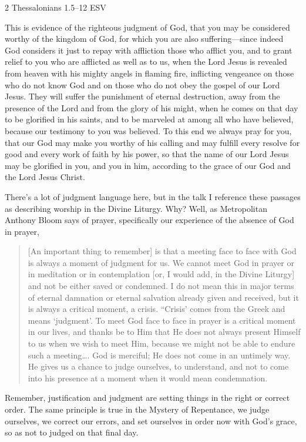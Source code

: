 \documentclass[
]{article}
\begin{document}
2 Thessalonians 1.5--12 ESV

This is evidence of the righteous judgment of God, that you may be
considered worthy of the kingdom of God, for which you are also
suffering---since indeed God considers it just to repay with affliction
those who afflict you, and to grant relief to you who are afflicted as
well as to us, when the Lord Jesus is revealed from heaven with his
mighty angels in flaming fire, inflicting vengeance on those who do not
know God and on those who do not obey the gospel of our Lord Jesus. They
will suffer the punishment of eternal destruction, away from the
presence of the Lord and from the glory of his might, when he comes on
that day to be glorified in his saints, and to be marveled at among all
who have believed, because our testimony to you was believed. To this
end we always pray for you, that our God may make you worthy of his
calling and may fulfill every resolve for good and every work of faith
by his power, so that the name of our Lord Jesus may be glorified in
you, and you in him, according to the grace of our God and the Lord
Jesus Christ.

There's a lot of judgment language here, but in the talk I reference
these passages as describing worship in the Divine Liturgy. Why? Well,
as Metropolitan Anthony Bloom says of prayer, specifically our
experience of the absence of God in prayer,

\begin{quote}
{[}An important thing to remember{]} is that a meeting face to face with
God is always a moment of judgment for us. We cannot meet God in prayer
or in meditation or in contemplation {[}or, I would add, in the Divine
Liturgy{]} and not be either saved or condemned. I do not mean this in
major terms of eternal damnation or eternal salvation already given and
received, but it is always a critical moment, a crisis. ``Crisis' comes
from the Greek and means `judgment'. To meet God face to face in prayer
is a critical moment in our lives, and thanks be to Him that He does not
always present Himself to us when we wish to meet Him, because we might
not be able to endure such a meeting\ldots. God is merciful; He does not
come in an untimely way. He gives us a chance to judge ourselves, to
understand, and not to come into his presence at a moment when it would
mean condemnation.
\end{quote}

Remember, justification and judgment are setting things in the right or
correct order. The same principle is true in the Mystery of Repentance,
we judge ourselves, we correct our errors, and set ourselves in order
now with God's grace, so as not to judged on that final day.
\end{document}
